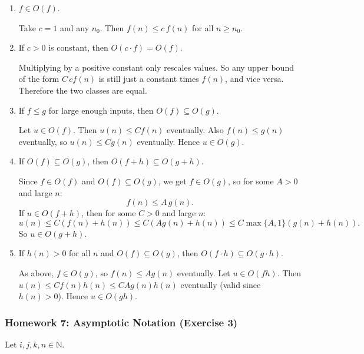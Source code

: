 \documentclass{article}
\theoremstyle{theorem}
\theoremstyle{definition}
\theoremstyle{remark}
\begin{document}
\begin{enumerate}
  \item $f\in O(f)$.
  
  Take $c=1$ and any $n_0$. Then $f(n)\le c\,f(n)$ for all $n\ge n_0$.

  \item If $c>0$ is constant, then $O(c\cdot f)=O(f)$.
  
  Multiplying by a positive constant only rescales values. So any upper bound of the form $C\,c f(n)$ is still just a constant times $f(n)$, and vice versa.
  Therefore the two classes are equal.

  \item If $f\le g$ for large enough inputs, then $O(f)\subseteq O(g)$.
  
  Let $u\in O(f)$. Then $u(n)\le C f(n)$ eventually. Also $f(n)\le g(n)$ eventually, so $u(n)\le C g(n)$ eventually. Hence $u\in O(g)$.

  \item If $O(f)\subseteq O(g)$, then $O(f+h)\subseteq O(g+h)$.
  
  Since $f\in O(f)$ and $O(f)\subseteq O(g)$, we get $f\in O(g)$, so for some $A>0$ and large $n$:
  \[
  f(n)\le A\,g(n).
  \]
  If $u\in O(f+h)$, then for some $C>0$ and large $n$:
  \[
  u(n)\le C(f(n)+h(n))\le C(A g(n)+h(n))\le C\max\{A,1\}(g(n)+h(n)).
  \]
  So $u\in O(g+h)$.

  \item If $h(n)>0$ for all $n$ and $O(f)\subseteq O(g)$, then $O(f\cdot h)\subseteq O(g\cdot h)$.
  
  As above, $f\in O(g)$, so $f(n)\le A g(n)$ eventually.
  Let $u\in O(fh)$. Then $u(n)\le C f(n)h(n)\le C A g(n)h(n)$ eventually (valid since $h(n)>0$).
  Hence $u\in O(gh)$.
\end{enumerate}

\subsubsection{Homework 7: Asymptotic Notation (Exercise 3)}

Let $i,j,k,n\in\mathbb{N}$.
\end{document}
